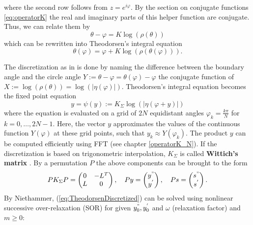 where the second row follows from $z = e^{i\varphi}$.
By the section on conjugate functions \ref{eq:operatorK} the real and imaginary parts of this helper function are conjugate. Thus, we can relate them by
\begin{equation}
    \theta - \varphi = K \log(\rho(\theta))
\end{equation}
which can be rewritten into Theodorsen's integral equation
\begin{equation}
    \theta(\varphi) = \varphi + K \log(\rho(\theta(\varphi))).
\end{equation}

The discretization as in \cite{Gutknecht1983_theodorsen_equation_FFT} is done by naming the difference between the boundary angle and the circle angle $Y := \theta - \varphi = \theta(\varphi) - \varphi$ the conjugate function of $X:= \log(\rho(\theta))= \log(|\eta(\varphi)|)$.
Theodorsen's integral equation becomes the fixed point equation
\begin{equation}\label{eq:TheodorsenDiscretized}
    y=\psi(y):=K_{\Sigma} \log(|\eta(\varphi+y)|)
\end{equation} 
where the equation is evaluated on a grid of $2N$ equidistant angles $\varphi_k = \frac{k\pi}{N}$ for $k=0, \dots, 2N-1$. Here, the vector $y$ approximates the values of the continuous function $Y(\varphi)$ at these grid points, such that $y_k \approx Y(\varphi_k)$.
The product $y$ can be computed efficiently using FFT (see chapter \ref{operatorK_N}).
\iffalse
If the discretization is based on trigonometric interpolation, $K_{\Sigma}$ is called \textbf{Wittich's matrix} \cite{Gutknecht1983_theodorsen_equation_FFT}.
By a permutation $P$ the above components can be brought to the form
\begin{equation}
    PK_{\Sigma}P =
    \begin{pmatrix}
        0 & -L^T \\
        L & 0
    \end{pmatrix}, \quad
    Py = \begin{pmatrix}
        y^{"} \\
        y^{' }
    \end{pmatrix}, \quad
    Ps = \begin{pmatrix}
        s^{"} \\
        s^{'}
    \end{pmatrix}.
\end{equation}
By Niethammer, (\ref{eq:TheodorsenDiscretized}) can be solved using nonlinear successive over-relaxation (SOR) for given $y_0^{"}, y_0^{'}$ and $\omega$ (relaxation factor) and $m\geq 0$:

